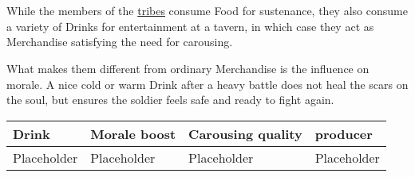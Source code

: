 \section{}\label{ch:Goods:Drink}

While the members of the \hyperref[ch:Tribes]{tribes} consume \gls{Food} for
sustenance, they also consume a variety of \glspl{Drink} for entertainment at a
tavern, in which case they act as \gls{Merchandise} satisfying the need for
carousing.

What makes them different from ordinary \gls{Merchandise} is the influence on
morale. A nice cold or warm \gls{Drink} after a heavy battle does not heal the
scars on the soul, but ensures the soldier feels safe and ready to fight again.

\begin{longtable}{llll}
	\toprule
	\Gls*{Drink} & Morale boost & Carousing quality & producer    \\
	\midrule
	Placeholder  & Placeholder  & Placeholder       & Placeholder \\
	\bottomrule
\end{longtable}
